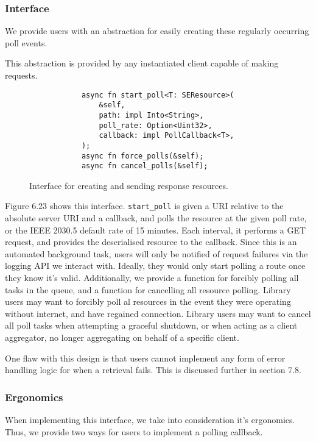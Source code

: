 \subsubsection{Interface}
We provide users with an abstraction for easily creating these regularly occurring poll events.

This abstraction is provided by any instantiated client capable of making requests.

\begin{figure}[h]
    \begin{center}
        \begin{lstlisting}
            async fn start_poll<T: SEResource>(
                &self,
                path: impl Into<String>,
                poll_rate: Option<Uint32>,
                callback: impl PollCallback<T>,
            );
            async fn force_polls(&self);
            async fn cancel_polls(&self);
        \end{lstlisting}
        \label{fig:pollinterface}
        \vspace{-10pt}
        \caption{Interface for creating and sending response resources.}
    \end{center}
\end{figure}

Figure 6.23 shows this interface. \texttt{start\_poll} is given a URI relative to the absolute server URI and a callback, and polls the resource at the given poll rate, or the IEEE 2030.5 default rate of 15 minutes. Each interval, it performs a GET request, and provides the deserialised resource to the callback. Since this is an automated background task, users will only be notified of request failures via the logging API we interact with. Ideally, they would only start polling a route once they know it's valid.
Additionally, we provide a function for forcibly polling all tasks in the queue, and a function for cancelling all resource polling. Library users may want to forcibly poll al resources in the event they were operating without internet, and have regained connection. Library users may want to cancel all poll tasks when attempting a graceful shutdown, or when acting as a client aggregator, no longer aggregating on behalf of a specific client. 

One flaw with this design is that users cannot implement any form of error handling logic for when a retrieval fails. This is discussed further in section 7.8.

\subsubsection{Ergonomics}
When implementing this interface, we take into consideration it's ergonomics. Thus, we provide two ways for users to implement a polling callback.


